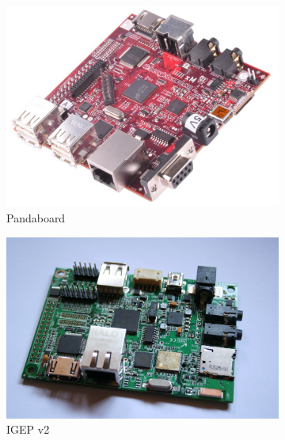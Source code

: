 \begin{figure}[ht!]
\centering
\begin{subfigure}{.5\textwidth}
		\includegraphics[width=\textwidth]{Chap3/figures/pandaboard}
		\caption{Pandaboard}
		\label{tech:fig:pandaboard}
		\end{subfigure}
\begin{subfigure}{.5\textwidth}
		\includegraphics[width=\textwidth]{Chap3/figures/igep}
		\caption{IGEP v2}
		\label{tech:fig:igep}
		\end{subfigure}
\begin{subfigure}{.5\textwidth}

\end{subfigure}
\end{figure}
